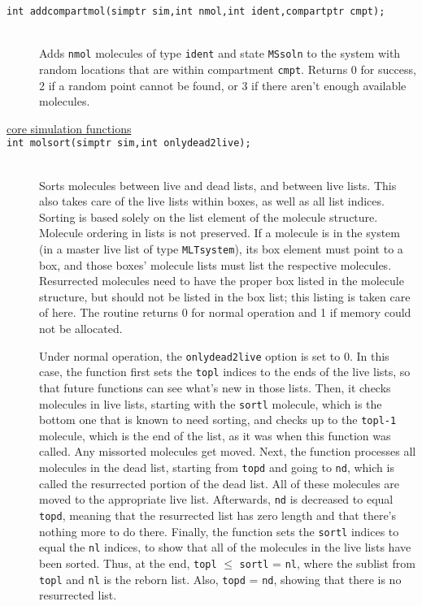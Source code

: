 \documentclass {book}
\begin{document}
\begin{description}
\item[\texttt{int addcompartmol(simptr sim,int nmol,int ident,compartptr cmpt);}]
\hfill \\
Adds \texttt{nmol} molecules of type \texttt{ident} and state \texttt{MSsoln} to the system with random locations that are within compartment \texttt{cmpt}.  Returns 0 for success, 2 if a random point cannot be found, or 3 if there aren't enough available molecules.

\item[\underline{core simulation functions}]

\item[\texttt{int molsort(simptr sim,int onlydead2live);}]
\hfill \\
Sorts molecules between live and dead lists, and between live lists.  This also takes care of the live lists within boxes, as well as all list indices.  Sorting is based solely on the list element of the molecule structure.  Molecule ordering in lists is not preserved.  If a molecule is in the system (in a master live list of type \texttt{MLTsystem}), its box element must point to a box, and those boxes' molecule lists must list the respective molecules.  Resurrected molecules need to have the proper box listed in the molecule structure, but should not be listed in the box list; this listing is taken care of here.  The routine returns 0 for normal operation and 1 if memory could not be allocated.

Under normal operation, the \texttt{onlydead2live} option is set to 0.  In this case, the function first sets the \texttt{topl} indices to the ends of the live lists, so that future functions can see what's new in those lists.  Then, it checks molecules in live lists, starting with the \texttt{sortl} molecule, which is the bottom one that is known to need sorting, and checks up to the \texttt{topl-1} molecule, which is the end of the list, as it was when this function was called.  Any missorted molecules get moved.  Next, the function processes all molecules in the dead list, starting from \texttt{topd} and going to \texttt{nd}, which is called the resurrected portion of the dead list.  All of these molecules are moved to the appropriate live list.  Afterwards, \texttt{nd} is decreased to equal \texttt{topd}, meaning that the resurrected list has zero length and that there's nothing more to do there.  Finally, the function sets the \texttt{sortl} indices to equal the \texttt{nl} indices, to show that all of the molecules in the live lists have been sorted.  Thus, at the end, \texttt{topl} $\leq$ \texttt{sortl} = \texttt{nl}, where the sublist from \texttt{topl} and \texttt{nl} is the reborn list.  Also, \texttt{topd} = \texttt{nd}, showing that there is no resurrected list.


\end{description}
\end{document}
